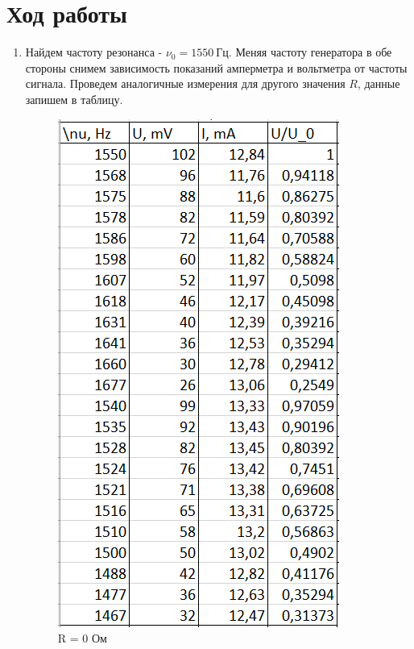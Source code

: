 \documentclass[a4paper, 12pt]{article}%
\begin{document}
\section{Ход работы}

\begin{enumerate}

\item Найдем частоту резонанса - $\nu_0 = 1550 \: \textit{Гц}$. Меняя частоту генератора в обе стороны снимем зависимость показаний амперметра и вольтметра от частоты сигнала. Проведем аналогичные измерения для другого значения $R$, данные запишем в таблицу.

\begin{figure}[h!]
    \begin{center}
        \begin{minipage}[h!]{0.4\linewidth}          
            \includegraphics[scale=1]{table1.png}
            \caption{R = 0 Ом}
            \label{fig:Image1}
        \end{minipage} 
        \hfill
        \begin{minipage}[h!]{0.4\linewidth}          

\end{minipage}
\end{center}
\end{figure}
\end{enumerate}
\end{document}

